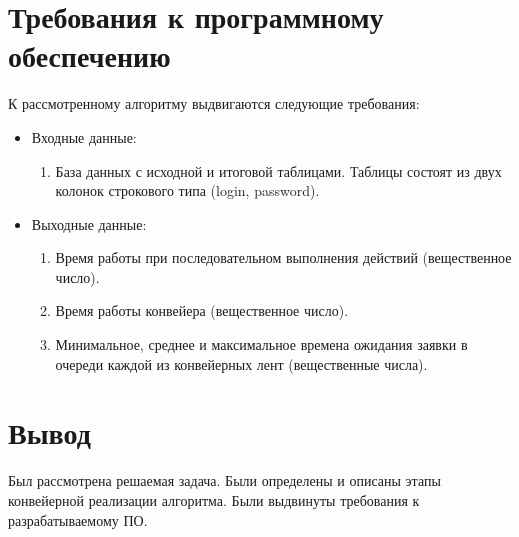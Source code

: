 \documentclass[../report.tex]{subfiles}
\begin{document}
\section{Требования к программному обеспечению}
К рассмотренному алгоритму выдвигаются следующие требования:
\begin{itemize}
	\item Входные данные:
		\begin{enumerate}
			\item База данных с исходной и итоговой таблицами. Таблицы состоят из двух колонок строкового типа (login, password).
		\end{enumerate}
	
	\item Выходные данные:
		\begin{enumerate}
			\item Время работы при последовательном выполнения действий (вещественное число).
			\item Время работы конвейера (вещественное число).
			\item Минимальное, среднее и максимальное времена ожидания заявки в очереди каждой из конвейерных лент (вещественные числа).
		\end{enumerate}
\end{itemize}

\section*{Вывод}
Был рассмотрена решаемая задача. Были определены и описаны этапы конвейерной реализации алгоритма. Были выдвинуты требования к разрабатываемому ПО.
\end{document}

